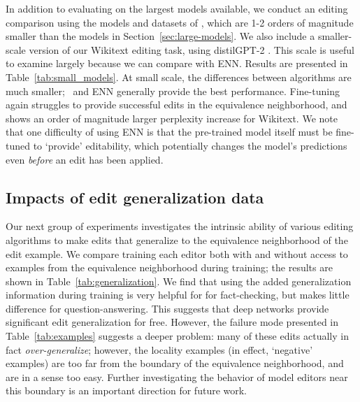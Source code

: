 \documentclass{article}
\begin{document}
In addition to evaluating on the largest models available, we conduct an editing comparison using the models and datasets of \cite{Cao2021EditingFK}, which are 1-2 orders of magnitude smaller than the models in Section~\ref{sec:large-models}. We also include a smaller-scale version of our Wikitext editing task, using distilGPT-2 \citep{distilgpt2}. This scale is useful to examine largely because we can compare with ENN. Results are presented in Table~\ref{tab:small_models}. At small scale, the differences between algorithms are much smaller;
\name~and ENN generally provide the best performance. Fine-tuning again struggles to provide successful edits in the equivalence neighborhood, and shows an order of magnitude larger perplexity increase for Wikitext. We note that one difficulty of using ENN is that the pre-trained model itself must be fine-tuned to `provide' editability, which potentially changes the model's predictions even \textit{before} an edit has been applied.



\subsection{Impacts of edit generalization data}
\label{sec:generalization}
Our next group of experiments investigates the intrinsic ability of various editing algorithms to make edits that generalize to the equivalence neighborhood of the edit example. We compare training each editor both with and without access to examples from the equivalence neighborhood during training; the results are shown in Table~\ref{tab:generalization}. We find that using the added generalization information during training is very helpful for for fact-checking, but makes little difference for question-answering. This suggests that deep networks provide significant edit generalization for free. However, the failure mode presented in Table~\ref{tab:examples} suggests a deeper problem: many of these edits actually in fact \textit{over-generalize}; however, the locality examples (in effect, `negative' examples) are too far from the boundary of the equivalence neighborhood, and are in a sense too easy. Further investigating the behavior of model editors near this boundary is an important direction for future work.
\end{document}
